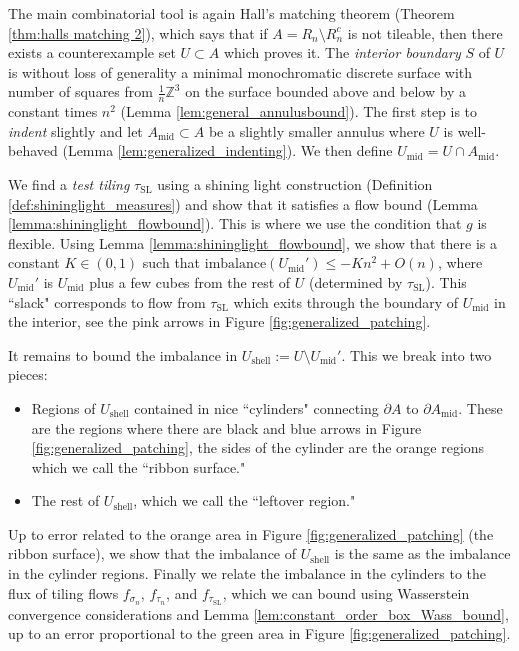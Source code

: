\documentclass[11pt]{article}
\theoremstyle{remark}
\theoremstyle{definition}
\newcommand{\m}[1]{\mathbb{#1}}
\begin{document}
The main combinatorial tool is again Hall's matching theorem (Theorem \ref{thm:halls matching 2}), which says that if $A =R_n\setminus R_n^c$ is not tileable, then there exists a counterexample set $U\subset A$ which proves it. The \textit{interior boundary} $S$ of $U$ is without loss of generality a minimal monochromatic discrete surface with number of squares from $\frac{1}{n} \m Z^3$ on the surface bounded above and below by a constant times $n^2$ (Lemma \ref{lem:general_annulusbound}). The first step is to \textit{indent} slightly and let $A_{\text{mid}}\subset A$ be a slightly smaller annulus where $U$ is well-behaved (Lemma \ref{lem:generalized_indenting}). We then define $U_{\text{mid}} = U\cap A_{\text{mid}}$. 

We find a \textit{test tiling} $\tau_{\text{SL}}$ using a shining light construction (Definition \ref{def:shininglight_measures}) and show that it satisfies a flow bound (Lemma \ref{lemma:shininglight_flowbound}). This is where we use the condition that $g$ is flexible. Using Lemma \ref{lemma:shininglight_flowbound}, we show that there is a constant $K \in (0,1)$ such that $\text{imbalance}(U_{\text{mid}}') \leq - K n^2 + O(n)$, where $U_{\text{mid}}'$ is $U_{\text{mid}}$ plus a few cubes from the rest of $U$ (determined by $\tau_{\text{SL}}$). This ``slack" corresponds to flow from $\tau_{\text{SL}}$ which exits through the boundary of $U_{\text{mid}}$ in the interior, see the pink arrows in Figure \ref{fig:generalized_patching}.

It remains to bound the imbalance in $U_{\text{shell}} := U\setminus U_{\text{mid}}'$. This we break into two pieces: 
\begin{itemize}
    \item Regions of $U_{\text{shell}}$ contained in nice ``cylinders" connecting $\partial A$ to $\partial A_{\text{mid}}$. These are the regions where there are black and blue arrows in Figure \ref{fig:generalized_patching}, the sides of the cylinder are the orange regions which we call the ``ribbon surface."
    \item The rest of $U_{\text{shell}}$, which we call the ``leftover region." 
\end{itemize}
Up to error related to the orange area in Figure \ref{fig:generalized_patching} (the ribbon surface), we show that the imbalance of $U_{\text{shell}}$ is the same as the imbalance in the cylinder regions. Finally we relate the imbalance in the cylinders to the flux of tiling flows $f_{\sigma_n}$, $f_{\tau_n}$, and $f_{\tau_{\text{SL}}}$, which we can bound using Wasserstein convergence considerations and Lemma \ref{lem:constant_order_box_Wass_bound}, up to an error proportional to the green area in Figure \ref{fig:generalized_patching}.
\end{document}
